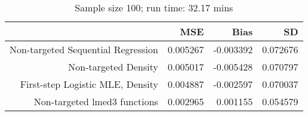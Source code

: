 \begin{table}[ht]
\centering
\caption{Sample size 100; run time: 32.17 mins} 
\begin{tabular}{rrrr}
  \hline
 & MSE & Bias & SD \\ 
  \hline
Non-targeted Sequential Regression & 0.005267 & -0.003392 & 0.072676 \\ 
  Non-targeted Density & 0.005017 & -0.005428 & 0.070797 \\ 
  First-step Logistic MLE, Density & 0.004887 & -0.002597 & 0.070037 \\ 
  Non-targeted lmed3 functions & 0.002965 & 0.001155 & 0.054579 \\ 
   \hline
\end{tabular}
\end{table}
